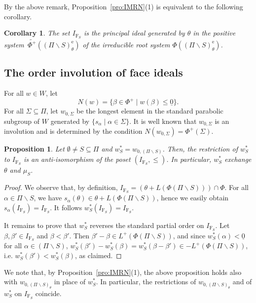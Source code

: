 \documentclass[10pt]{amsart}
\newtheorem{pro}[thm]{Proposition}
\newtheorem{cor}[thm]{Corollary}
\theoremstyle{definition}
\theoremstyle{remark}
\newcommand\wt{\widetilde}
\newcommand\smeno{\smallsetminus}
\newcommand\nullvec{\underline 0}
\newcommand\al{\alpha}
\newcommand\be{\beta}
\newcommand\erm{{\mathrm{e}}}
\renewcommand{\leq}{\leqslant}
\begin{document}
By the above remark, Proposition~\ref{pro:IMRN}(1) is equivalent to the following corollary.

\begin{cor}\label{cor:proIMRN}
The set $I_{\mathrm F_S}$ is the principal ideal generated by $\theta$  in the positive system~$\wt{\Phi^+}((\Pi \smeno S)^\erm_\theta)$ of the irreducible root system $\Phi((\Pi \smeno S)^\erm_\theta)$. 
\end{cor}

\subsection{The order involution of face ideals}\label{ssec:face-inv}

For all $w\in W$, let $$N(w)=\{\be\in \Phi^+\mid w(\be)\leq \nullvec\}.$$
For all $\Sigma\subseteq \Pi$, let $w_{0,\Sigma}$ be the longest element in the standard parabolic subgroup of $W$ generated by $\{s_\al\mid \al\in \Sigma\}$.
It is well known that $w_{0,\Sigma}$ is an involution and is determined by the condition $N(w_{0,\Sigma})=\Phi^+(\Sigma)$.

\begin{pro}\label{pro:face-involution}
Let $\emptyset\neq S\subseteq \Pi$ and $w^*_{S}=w_{0,(\Pi\smeno S)}$. 
Then, the restriction of $w^*_{S}$ to $I_{\mathrm F_S}$ is an anti-isomorphism of the poset $(I_{\mathrm F_S}, \leq)$. 
In particular, $w^*_{S}$ exchange $\theta$ and $\mu_S$.
\end{pro}

\begin{proof}
We observe that, by definition, $I_{\mathrm F_S}=(\theta+L(\Phi(\Pi\smeno S)))\cap \Phi$.
For all $\al\in \Pi\smeno S$, we have $s_\al(\theta)\in \theta+L(\Phi(\Pi\smeno S))$, hence we easily obtain $s_\al(I_{\mathrm F_S})=I_{\mathrm F_S}$. 
It follows  $w^*_{S}(I_{\mathrm F_S})=I_{\mathrm F_S}$. 
\par
It remains to prove that $w^*_{S}$ reverses the standard partial order on $I_{\mathrm F_S}$.
Let $\be, \be'\in I_{\mathrm F_S}$ and $\be< \be'$. 
Then  $\be'-\be\in L^+(\Phi(\Pi\smeno S))$, and  
since $w^*_{S}(\al)< \nullvec$ for all $\al\in (\Pi\smeno S)$, $w^*_{S}(\be')-w^*_{S}(\be)=w^*_{S}(\be-\be')\in -L^+(\Phi(\Pi\smeno S))$, i.e.  $w^*_{S}(\be') < w^*_{S}(\be)$, as claimed. 
\end{proof}

We note that, by Proposition~\ref{pro:IMRN}(1), the above proposition holds also with  $w_{0,(\Pi\smeno S)_\theta}$ in place of $w^*_{S}$. 
In particular, the restrictions of $w_{0,(\Pi\smeno S)_\theta}$ and of $w^*_{S}$ on $I_{\mathrm F_S}$ coincide.
\par
\end{document}
